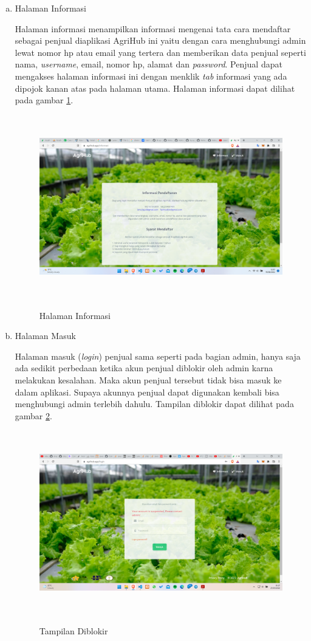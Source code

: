 \begin{enumerate}
	\begin{enumerate}[a.]
		\item Halaman Informasi
		\par Halaman informasi menampilkan informasi mengenai tata cara mendaftar sebagai penjual diaplikasi AgriHub ini yaitu dengan cara menghubungi admin lewat nomor hp atau email yang tertera dan memberikan data penjual seperti nama, \textit{username}, email, nomor hp, alamat dan \textit{password}. Penjual dapat mengakses halaman informasi ini dengan menklik \textit{tab} informasi yang ada dipojok kanan atas pada halaman utama. Halaman informasi dapat dilihat pada gambar \ref*{informasi}.
		\begin{figure}[H]
			\centering
			{\includegraphics [width = 13.5cm, height= 8cm]{gambar/informasi}}
			\caption{Halaman Informasi}
			\label{informasi}
		\end{figure}

		\item Halaman Masuk
		\par Halaman masuk (\textit{login}) penjual sama seperti pada bagian admin, hanya saja ada sedikit perbedaan ketika akun penjual diblokir oleh admin karna melakukan kesalahan. Maka akun penjual tersebut tidak bisa masuk ke dalam aplikasi. Supaya akunnya penjual dapat digunakan kembali bisa menghubungi admin terlebih dahulu. Tampilan diblokir dapat dilihat pada gambar \ref*{diblokir}.
		\begin{figure}[H]
			\centering
			{\includegraphics [width = 13.5cm, height= 8cm]{gambar/diblokir}}
			\caption{Tampilan Diblokir}
			\label{diblokir}
		\end{figure}


\end{enumerate}
\end{enumerate}
